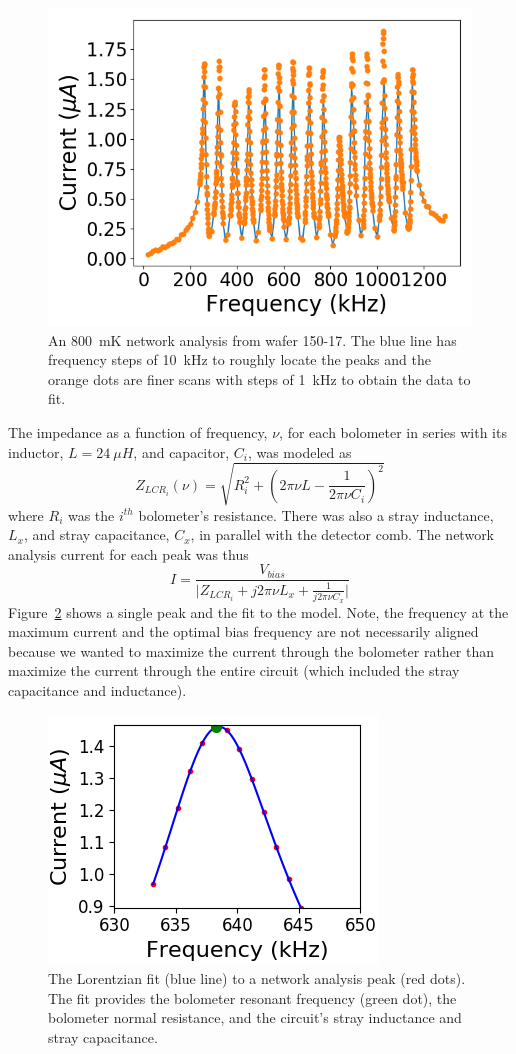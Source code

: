\begin{figure}[htbp]
\begin{center}
\includegraphics[width=0.6\columnwidth]{figures/SqCh3_netanal.png}
\caption{An 800~mK network analysis from wafer 150-17. The blue line has frequency steps of 10~kHz to roughly locate the peaks and the orange dots are finer scans with steps of 1~kHz to obtain the data to fit. 
\label{fig:network_analysis} }
\end{center}
\end{figure}

The impedance as a function of frequency, $\nu$, for each bolometer in series with its inductor, $L=24~\mu H$, and capacitor, $C_{i}$, was modeled as
\begin{equation}
Z_{LCR_{i}} \left(\nu\right) = \sqrt{ R_{i}^{2} + \left(2\pi \nu L - \frac{1}{2\pi \nu C_{i}}\right)^{2}}
\end{equation}
where $R_{i}$ was the $i^{th}$ bolometer's resistance.
There was also a stray inductance, $L_{x}$, and stray capacitance, $C_{x}$, in parallel with the detector comb. 
The network analysis current for each peak was thus
\begin{equation}
I = \frac{V_{bias}}{\lvert Z_{LCR_{i}} + j 2\pi \nu L_{x} + \frac{1}{j 2\pi \nu C_{x}}\rvert}
\end{equation}
Figure~\ref{fig:netanal_fit} shows a single peak and the fit to the model.
Note, the frequency at the maximum current and the optimal bias frequency are not necessarily aligned because we wanted to maximize the current through the bolometer rather than maximize the current through the entire circuit (which included the stray capacitance and inductance).

\begin{figure}[htbp]
\begin{center}
\includegraphics[width=0.3\columnwidth]{figures/netanal_etcsqb_SqCh3_10K_20110606_5to8.png}
\caption{The Lorentzian fit (blue line) to a network analysis peak (red dots). The fit provides the bolometer resonant frequency (green dot), the bolometer normal resistance, and the circuit's stray inductance and stray capacitance. 
\label{fig:netanal_fit} }
\end{center}
\end{figure}

